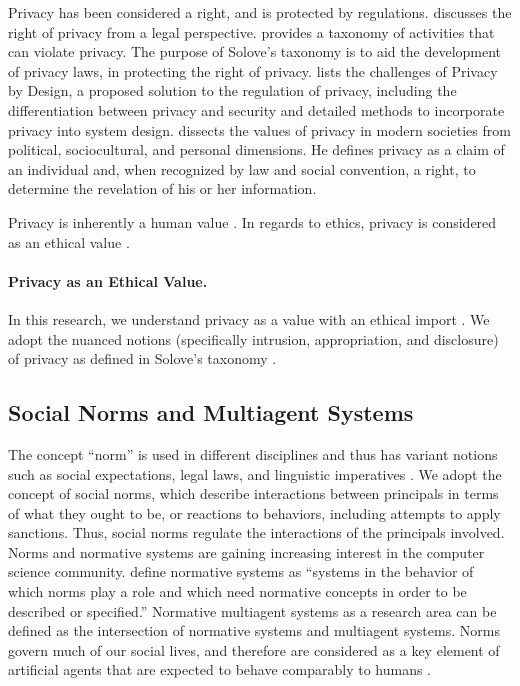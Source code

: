 Privacy has been considered a right, and is protected by regulations. 
\citet{Prosser-60:Privacy} discusses the right of privacy from a legal perspective. 
\citet{solove-2006-taxonomy} provides a taxonomy of activities that can violate privacy. 
The purpose of Solove's taxonomy is to aid the development of privacy laws, in protecting the right of privacy.
\citet{Spiekermann-2012-Challenges+PrivacyDesign} lists the challenges of Privacy by Design, a proposed solution to the regulation of privacy, including the differentiation between privacy and security and detailed methods to incorporate privacy into system design. 
\citet{westin2003social} dissects the values of privacy in modern societies from political, sociocultural, and personal dimensions.
He defines privacy as a claim of an individual and, when recognized by law and social convention, a right, to determine the revelation of his or her information.


Privacy is inherently a human value \citep{spiekermann2009enggprivacy,smith2007privacy}. 
In regards to ethics, privacy is considered as an ethical value \citep{Langheinrich-01:privacy,Taylor-2002-PrivacyAutonomy}. 


\paragraph*{Privacy as an Ethical Value.}
In this research, we understand privacy as a value with an ethical import \citep{Langheinrich-01:privacy,Taylor-2002-PrivacyAutonomy}. 
We adopt the nuanced notions (specifically intrusion, appropriation, and disclosure) of privacy as defined in Solove's taxonomy \citep{solove-2006-taxonomy}. 


\subsection{Social Norms and Multiagent Systems}

The concept ``norm'' is used in different disciplines and thus has
variant notions such as social expectations, legal laws, and linguistic
imperatives \citep{Boella2009NormativeSystems}. We adopt the concept of
social norms, which describe interactions between principals in terms of
what they ought to be, or reactions to behaviors, including attempts to
apply sanctions. Thus, social norms regulate the interactions of the
principals involved. Norms and normative systems are gaining increasing
interest in the computer science community. \citet{Meyer+Wieringa-93}
define normative systems as ``systems in the behavior of which norms
play a role and which need normative concepts in order to be described
or specified.'' Normative multiagent systems as a research area can be
defined as the intersection of normative systems and multiagent systems.
Norms govern much of our social lives, and therefore are considered as a
key element of artificial agents that are expected to behave comparably
to humans \citep{boella2006normative}. 

